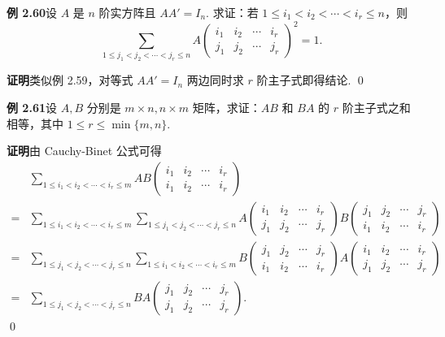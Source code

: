 \documentclass[UTF8,12pt,a4paper,fontset=fandol]{ctexart}
\begin{document}
\noindent\textbf{例 2.60}\quad 设 $A$ 是 $n$ 阶实方阵且 $AA'=I_n$. 求证：若 $1\le i_1<i_2<\cdots<i_r\le n$，则
\[
\sum_{1\le j_1<j_2<\cdots<j_r\le n}
A\left(
\begin{array}{cccc}
i_1 & i_2 & \cdots & i_r\\
j_1 & j_2 & \cdots & j_r
\end{array}
\right)^2=1.
\]

\noindent\textbf{证明}\quad 类似例 2.59，对等式 $AA'=I_n$ 两边同时求 $r$ 阶主子式即得结论. \qed

\noindent\textbf{例 2.61}\quad 设 $A,B$ 分别是 $m\times n,n\times m$ 矩阵，求证：$AB$ 和 $BA$ 的 $r$ 阶主子式之和相等，其中 $1\le r\le\min\{m,n\}$.

\noindent\textbf{证明}\quad 由 Cauchy-Binet 公式可得
\[
\begin{aligned}
&\sum_{1\le i_1<i_2<\cdots<i_r\le m}
AB\left(
\begin{array}{cccc}
i_1 & i_2 & \cdots & i_r\\
i_1 & i_2 & \cdots & i_r
\end{array}
\right)\\
={}&
\sum_{1\le i_1<i_2<\cdots<i_r\le m}
\sum_{1\le j_1<j_2<\cdots<j_r\le n}
A\left(
\begin{array}{cccc}
i_1 & i_2 & \cdots & i_r\\
j_1 & j_2 & \cdots & j_r
\end{array}
\right)
B\left(
\begin{array}{cccc}
j_1 & j_2 & \cdots & j_r\\
i_1 & i_2 & \cdots & i_r
\end{array}
\right)\\
={}&
\sum_{1\le j_1<j_2<\cdots<j_r\le n}
\sum_{1\le i_1<i_2<\cdots<i_r\le m}
B\left(
\begin{array}{cccc}
j_1 & j_2 & \cdots & j_r\\
i_1 & i_2 & \cdots & i_r
\end{array}
\right)
A\left(
\begin{array}{cccc}
i_1 & i_2 & \cdots & i_r\\
j_1 & j_2 & \cdots & j_r
\end{array}
\right)\\
={}&
\sum_{1\le j_1<j_2<\cdots<j_r\le n}
BA\left(
\begin{array}{cccc}
j_1 & j_2 & \cdots & j_r\\
j_1 & j_2 & \cdots & j_r
\end{array}
\right).
\end{aligned}
\]
\qed
\end{document}
